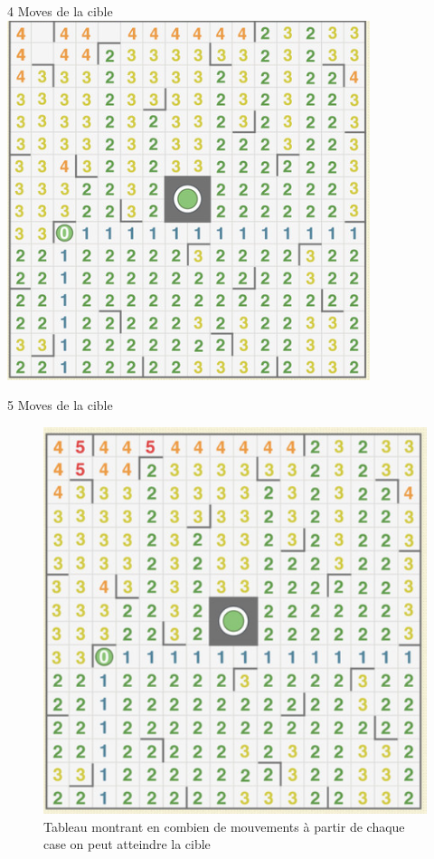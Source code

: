 \documentclass{beamer}
\begin{document}
    \begin{frame}{4 Moves de la cible}
        \centering
        \includegraphics[scale=0.45]{Images/h4.png}
    \end{frame} 
    \begin{frame}{5 Moves de la cible}
        \begin{figure}
            \centering
            \includegraphics[scale=0.55]{Images/mapHeuristique.PNG}
            \caption{Tableau montrant en combien de mouvements à partir de chaque case on peut atteindre la cible \cite{heurist}}
            
        \end{figure}
    \end{frame}
\end{document}
